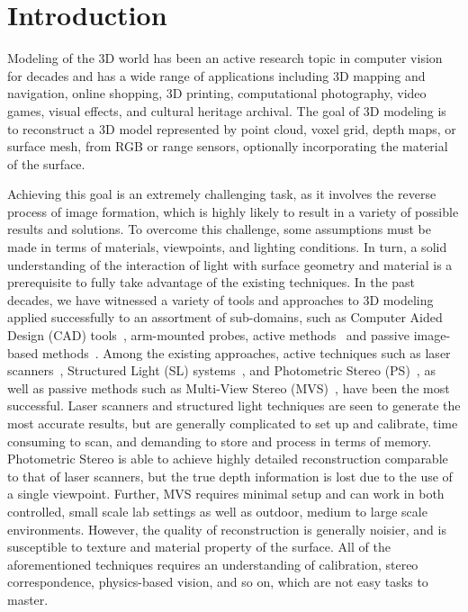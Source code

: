 
\chapter{Introduction}
\label{ch:Introduction}
Modeling of the 3D world has been an active research topic in computer vision for decades and has a wide range of applications including 3D mapping and navigation, online shopping, 3D printing, computational photography, video games, visual effects, and cultural heritage archival. The goal of 3D modeling is to reconstruct a 3D model represented by point cloud, voxel grid, depth maps, or surface mesh, from RGB or range sensors, optionally incorporating the material of the surface.

Achieving this goal is an extremely challenging task, as it involves the reverse process of image formation, which is highly likely to result in a variety of possible results and solutions. To overcome this challenge, some assumptions must be made in terms of materials, viewpoints, and lighting conditions. In turn, a solid understanding of the interaction of light with surface geometry and material is a prerequisite to fully take advantage of the existing techniques. In the past decades, we have witnessed a variety of tools and approaches to 3D modeling applied successfully to an assortment of sub-domains, such as Computer Aided Design (CAD) tools~\cite{CAD}, arm-mounted probes, active methods~\cite{bernardini2002building,levoy2000digital,Lidar,kinect} and passive image-based methods~\cite{kutulakos2000theory,furukawa2010accurate,faugeras2002variational,goesele2006multi}. Among the existing approaches, active techniques such as laser scanners~\cite{levoy2000digital}, Structured Light (SL) systems~\cite{bernardini2002building}, and Photometric Stereo (PS)~\cite{woodham1980photometric}, as well as passive methods such as Multi-View Stereo (MVS)~\cite{seitz2006comparison}, have been the most successful. Laser scanners and structured light techniques are seen to generate the most accurate results, but are generally complicated to set up and calibrate, time consuming to scan, and demanding to store and process in terms of memory. Photometric Stereo is able to achieve highly detailed reconstruction comparable to that of laser scanners, but the true depth information is lost due to the use of a single viewpoint. Further, MVS requires minimal setup and can work in both controlled, small scale lab settings as well as outdoor, medium to large scale environments. However, the quality of reconstruction is generally noisier, and is susceptible to texture and material property of the surface. All of the aforementioned techniques requires an understanding of calibration, stereo correspondence, physics-based vision, and so on, which are not easy tasks to master.

